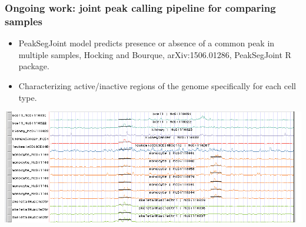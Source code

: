 \documentclass{beamer}
\begin{document}
\begin{frame}
  \frametitle{Ongoing work: joint peak calling pipeline for comparing samples}
\begin{itemize}
\item PeakSegJoint model predicts presence or absence of a common peak
  in multiple samples, Hocking and Bourque, arXiv:1506.01286,
  PeakSegJoint R package.
\item Characterizing active/inactive regions of the genome
  specifically for each cell type.
\end{itemize}
\includegraphics[width=\textwidth]{PeakSegJoint-monocytes-up}
\end{frame}
\end{document}
